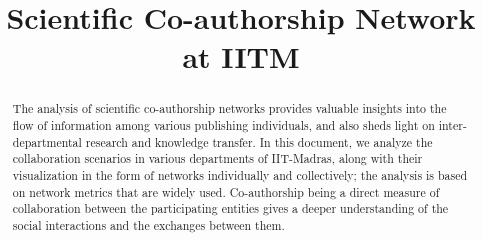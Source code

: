 \documentclass[conference,compsoc]{IEEEtran}
\begin{document}
%
\title{Scientific Co-authorship Network at IITM}





% 
\author{
}








\maketitle
\thispagestyle{plain}
\pagestyle{plain}
\begin{abstract}
The analysis of scientific co-authorship networks provides valuable insights into the flow of information among various publishing individuals, and also sheds light on inter-departmental research and knowledge transfer. In this document, we analyze the collaboration scenarios in various departments of IIT-Madras, along with their visualization in the form of networks individually and collectively; the analysis is based on network metrics that are widely used. Co-authorship being a direct measure of collaboration between the participating entities gives a deeper understanding of the social interactions and the exchanges between them.
\end{abstract}
\end{document}
